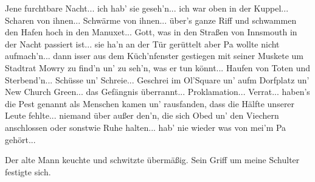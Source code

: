 \glqq Jene furchtbare Nacht... ich hab' sie geseh'n... ich war oben in der Kuppel... Scharen von ihnen... Schwärme von ihnen... über's ganze Riff und schwammen den Hafen hoch in den Manuxet... Gott, was in den Straßen von Innsmouth in der Nacht passiert ist... sie ha'n an der Tür gerüttelt aber Pa wollte nicht aufmach'n... dann isser aus dem Küch'nfenster gestiegen mit seiner Muskete um Stadtrat Mowry zu find'n un' zu seh'n, was er tun könnt... Haufen von Toten und Sterbend'n... Schüsse un' Schreie... Geschrei im Ol'Square un' aufm Dorfplatz un' New Church Green... das Gefängnis überrannt... Proklamation... Verrat... haben's die Pest genannt als Menschen kamen un' rausfanden, dass die Hälfte unserer Leute fehlte... niemand über außer den'n, die sich Obed un' den Viechern anschlossen oder sonstwie Ruhe halten... hab' nie wieder was von mei'm Pa gehört...\grqq

Der alte Mann keuchte und schwitzte übermäßig. Sein Griff um meine Schulter festigte sich.